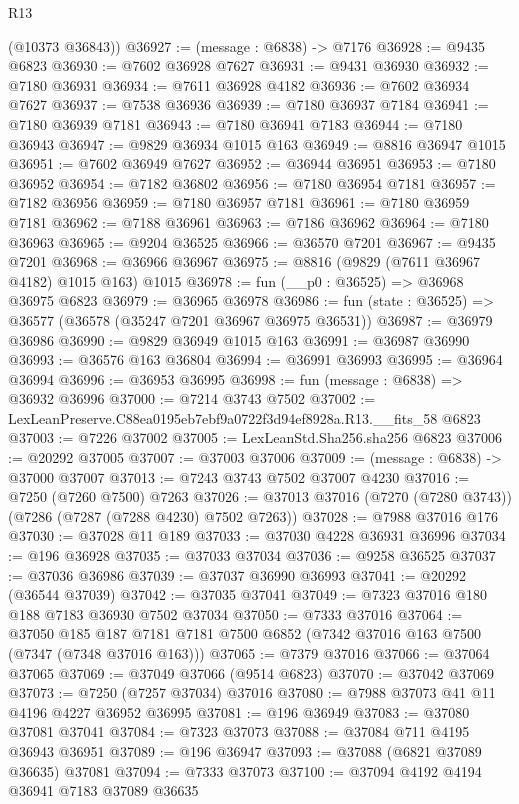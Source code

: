 \begin{lexlean}{R13}
\begin{coremodule}
      (@10373 @36843))
@36927 := (message : @6838) -> @7176
@36928 := @9435 @6823
@36930 := @7602 @36928 @7627
@36931 := @9431 @36930
@36932 := @7180 @36931
@36934 := @7611 @36928 @4182
@36936 := @7602 @36934 @7627
@36937 := @7538 @36936
@36939 := @7180 @36937 @7184
@36941 := @7180 @36939 @7181
@36943 := @7180 @36941 @7183
@36944 := @7180 @36943
@36947 := @9829 @36934 @1015 @163
@36949 := @8816 @36947 @1015
@36951 := @7602 @36949 @7627
@36952 := @36944 @36951
@36953 := @7180 @36952
@36954 := @7182 @36802
@36956 := @7180 @36954 @7181
@36957 := @7182 @36956
@36959 := @7180 @36957 @7181
@36961 := @7180 @36959 @7181
@36962 := @7188 @36961
@36963 := @7186 @36962
@36964 := @7180 @36963
@36965 := @9204 @36525
@36966 := @36570 @7201
@36967 := @9435 @7201
@36968 := @36966 @36967
@36975 := @8816 (@9829 (@7611 @36967 @4182) @1015 @163) @1015
@36978 := fun (__p0 : @36525) => @36968 @36975 @6823
@36979 := @36965 @36978
@36986 := fun (state : @36525) => @36577 (@36578 (@35247 @7201 @36967 @36975 @36531))
@36987 := @36979 @36986
@36990 := @9829 @36949 @1015 @163
@36991 := @36987 @36990
@36993 := @36576 @163 @36804
@36994 := @36991 @36993
@36995 := @36964 @36994
@36996 := @36953 @36995
@36998 := fun (message : @6838) => @36932 @36996
@37000 := @7214 @3743 @7502
@37002 := LexLeanPreserve.C88ea0195eb7ebf9a0722f3d94ef8928a.R13.__fits_58 @6823
@37003 := @7226 @37002
@37005 := LexLeanStd.Sha256.sha256 @6823
@37006 := @20292 @37005
@37007 := @37003 @37006
@37009 := (message : @6838) -> @37000 @37007
@37013 := @7243 @3743 @7502 @37007 @4230
@37016 := @7250 (@7260 @7500) @7263
@37026 := @37013 @37016 (@7270 (@7280 @3743)) (@7286 (@7287 (@7288 @4230) @7502 @7263))
@37028 := @7988 @37016 @176
@37030 := @37028 @11 @189
@37033 := @37030 @4228 @36931 @36996
@37034 := @196 @36928
@37035 := @37033 @37034
@37036 := @9258 @36525
@37037 := @37036 @36986
@37039 := @37037 @36990 @36993
@37041 := @20292 (@36544 @37039)
@37042 := @37035 @37041
@37049 := @7323 @37016 @180 @188 @7183 @36930 @7502 @37034
@37050 := @7333 @37016
@37064 := @37050
    @185
    @187
    @7181
    @7181
    @7500
    @6852
    (@7342 @37016 @163 @7500 (@7347 (@7348 @37016 @163)))
@37065 := @7379 @37016
@37066 := @37064 @37065
@37069 := @37049 @37066 (@9514 @6823)
@37070 := @37042 @37069
@37073 := @7250 (@7257 @37034) @37016
@37080 := @7988 @37073 @41 @11 @4196 @4227 @36952 @36995
@37081 := @196 @36949
@37083 := @37080 @37081 @37041
@37084 := @7323 @37073
@37088 := @37084 @711 @4195 @36943 @36951
@37089 := @196 @36947
@37093 := @37088 (@6821 @37089 @36635) @37081
@37094 := @7333 @37073
@37100 := @37094 @4192 @4194 @36941 @7183 @37089 @36635

\end{coremodule}
\end{lexlean}
